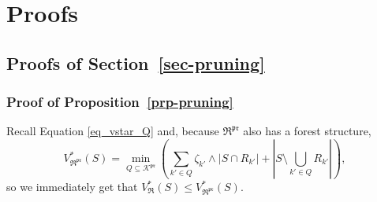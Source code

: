\documentclass[
  11pt,
  a4paper,
]{article}
\theoremstyle{definition}
\theoremstyle{plain}
\theoremstyle{plain}
\theoremstyle{plain}
\theoremstyle{definition}
\theoremstyle{remark}
\begin{document}
\section{Proofs}\label{sec-proofs}

\subsection{\texorpdfstring{Proofs of
Section~\ref{sec-pruning}}{Proofs of Section~}}\label{sec-pruning-proofs}

\subsubsection{\texorpdfstring{Proof of
Proposition~\ref{prp-pruning}}{Proof of Proposition~}}\label{sec-pruning-proofs-pruning}

Recall Equation \eqref{eq_vstar_Q} and, because
\(\mathfrak{R}^{\mathfrak{pr}}\) also has a forest structure,
\begin{equation}
V^*_{\mathfrak{R}^{\mathfrak{pr}}}(S)=\min_{Q\subseteq\mathcal{K}^{\mathfrak{pr}}}\left(\sum_{k'\in Q}\zeta_{k'}\wedge|S\cap R_{k'}|+\left| S\setminus\bigcup_{k'\in Q} R_{k'}   \right|\right),
\label{eq_vstarpruned_Q}
\end{equation} so we immediately get that
\(V^*_{\mathfrak{R}}(S)\leq V^*_{\mathfrak{R}^{\mathfrak{pr}}}(S)\).
\end{document}
